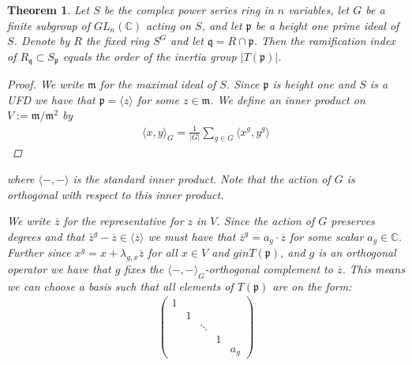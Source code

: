 \documentclass[11pt, a4paper, english]{article}
\numberwithin{prop}{section}
\numberwithin{lemma}{section}
\newtheorem{theorem}{Theorem}
\numberwithin{theorem}{section}
\numberwithin{defin}{section}
\numberwithin{example}{section}
\newcommand{\C}{\mathbb{C}}
\begin{document}
\begin{theorem}
Let $S$ be the complex power series ring in $n$ variables, let $G$ be  a finite subgroup of $GL_n(\C)$ acting on $S$, and let $\mathfrak{p}$ be a height one prime ideal of $S$. Denote by $R$ the fixed ring $S^G$ and let $\mathfrak{q} = R \cap \mathfrak{p}$. Then the ramification index of $R_\mathfrak{q} \subset S_\mathfrak{p}$ equals the order of the inertia group $|T(\mathfrak{p})|$.

\begin{proof}
We write $\mathfrak{m}$ for the maximal ideal of $S$. Since $\mathfrak{p}$ is height one and $S$ is a UFD we have that $\mathfrak{p} = \langle z \rangle$ for some $z \in \mathfrak{m}$. We define an inner product on $V := \mathfrak{m}/\mathfrak{m}^2$ by
\begin{align*}
\langle x, y \rangle_G = \frac{1}{|G|} \sum_{g \in G} \langle x^g,  y^g \rangle
\end{align*}
\end{proof}
where $\langle -,- \rangle$ is the standard inner product. Note that the action of $G$ is orthogonal with respect to this inner product.

We write $\overline{z}$ for the representative for $z$ in $V$. Since the action of $G$ preserves degrees and that $\overline{z}^g - \overline{z} \in \langle \overline{z} \rangle$ we must have that $\overline{z}^g = a_g \cdot \overline{z}$ for some scalar $a_g \in \C$. Further since $x^g = x + \lambda_{g,x}\overline{z}$ for all $x \in V$ and $g in T(\mathfrak{p})$, and $g$ is an orthogonal operator we have that $g$ fixes the $\langle -,- \rangle_G$-orthogonal complement to $\overline{z}$. This means we can choose a basis such that all elements of $T(\mathfrak{p})$ are on the form:
\begin{align*}
\begin{pmatrix}
1\\
& 1\\
&& \ddots\\
&&&1\\
&&&& a_g
\end{pmatrix}
\end{align*}


\end{theorem}
\end{document}
